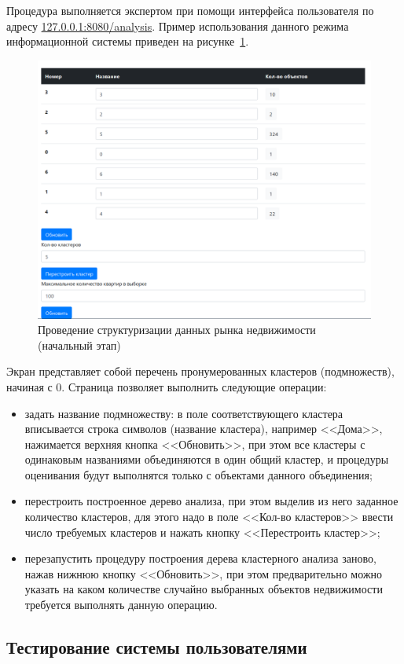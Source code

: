 \documentclass[a4paper,14pt,openany,final]{extreport} %
\def\oldcaption{} \let\oldcaption=\caption
\def\caption{\stepcounter{captionsnum}\oldcaption}
\begin{document}
Процедура выполняется экспертом при помощи интерфейса пользователя по адресу \url{127.0.0.1:8080/analysis}. Пример использования данного режима информационной системы приведен на рисунке~\ref{fig:exclus1}.
\begin{figure}[htbp]
  \centering
  \includegraphics[width=0.8\linewidth]{screen-cluster-start.png}
  \caption{Проведение структуризации данных рынка недвижимости (начальный этап)}
  \label{fig:exclus1}
\end{figure}

Экран представляет собой перечень пронумерованных кластеров (подмножеств), начиная с 0.  Страница позволяет выполнить следующие операции:
\begin{itemize}
\item задать название подмножеству: в поле соответствующего кластера вписывается строка символов (название кластера), например <<Дома>>, нажимается верхняя кнопка <<Обновить>>, при этом все кластеры с одинаковым названиями объединяются в один общий кластер, и процедуры оценивания будут выполнятся только с объектами данного объединения;
\item перестроить построенное дерево анализа, при этом выделив из него заданное количество кластеров, для этого надо в поле <<Кол-во кластеров>> ввести число требуемых кластеров и нажать кнопку <<Перестроить кластер>>;
\item перезапустить процедуру построения дерева кластерного анализа заново, нажав нижнюю кнопку <<Обновить>>, при этом предварительно можно указать на каком количестве случайно выбранных объектов недвижимости требуется выполнять данную операцию.
\end{itemize}

\subsection{Тестирование системы пользователями}
\end{document}
